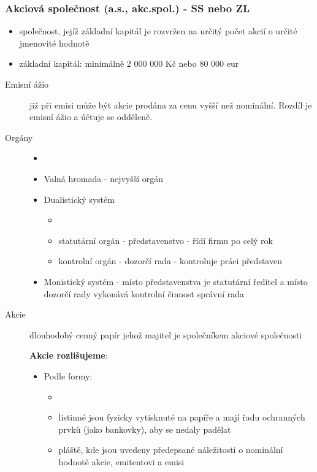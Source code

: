 \documentclass[11pt,a4paper,twoside]{book}
\begin{document}
				\subsubsection{Akciová společnost (a.s., akc.spol.) - SS nebo ZL}
					\begin{itemize}
						\item společnost, jejíž základní kapitál je rozvržen na určitý počet akcií o určité jmenovité hodnotě
						\item základní kapitál: minimálně 2 000 000 Kč nebo 80 000 eur
					\end{itemize}
					\begin{description}
						\item[Emisní ážio] již při emisi může být akcie prodána za cenu vyšší než nominální. Rozdíl je emisní ážio a účtuje se odděleně.
						\item[Orgány]
							\begin{itemize}
								\item []
								\item Valná hromada - nejvyšší orgán
								\item Dualistický systém
									\begin{itemize}
										\item []
										\item statutární orgán - představenstvo - řídí firmu po celý rok
										\item kontrolní orgán - dozorčí rada - kontroluje práci představen
									\end{itemize}
								\item Monistický systém - místo představenstva je statutární ředitel a místo dozorčí rady vykonává kontrolní činnost správní rada
							\end{itemize}
						\item[Akcie] dlouhodobý cenný papír jehož majitel je společníkem akciové společnosti \par \textbf{Akcie rozlišujeme}: 
							\begin{itemize}
								\item Podle formy:
									\begin{itemize}
										\item []
										\item listinné jsou fyzicky vytisknuté na papíře a mají řadu ochranných prvků (jako bankovky), aby se nedaly padělat
										\item pláště, kde jsou uvedeny předepsané náležitosti o nominální hodnotě akcie, emitentovi a emisi

\end{itemize}
\end{itemize}
\end{description}
\end{document}
